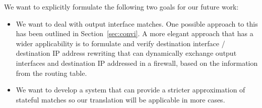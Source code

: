 We want to explicitly formulate the following two goals for our future work:
\begin{itemize}
	\item We want to deal with output interface matches.
		One possible approach to this has been outlined in Section~\ref{sec:convi}.
		A more elegant approach that has a wider applicability is to formulate and verify destination interface / destination IP address rewriting that can dynamically exchange output interfaces and destination IP addressed in a firewall, based on the information from the routing table.
	\item We want to develop a system that can provide a stricter approximation of stateful matches so our translation will be applicable in more cases.
\end{itemize}
